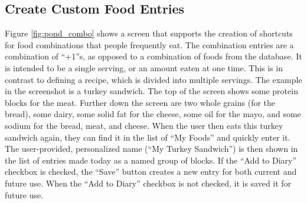 \subsection{Create Custom Food Entries}
Figure \ref{fig:pond_combo} shows a screen that supports the creation of shortcuts for food combinations that people frequently eat. The combination entries are a combination of ``+1''s, as opposed to a combination of foods from the database. It is intended to be a single serving, or an amount eaten at one time. This is in contrast to defining a recipe, which is divided into multiple servings. The example in the screenshot is a turkey sandwich. The top of the screen shows some protein blocks for the meat. Further down the screen are two whole grains (for the bread), some dairy, some solid fat for the cheese, some oil for the mayo, and some sodium for the bread, meat, and cheese. When the user then eats this turkey sandwich again, they can find it in the list of ``My Foods'' and quickly enter it. The user-provided, personalized name (``My Turkey Sandwich'') is then shown in the list of entries made today as a named group of blocks. If the ``Add to Diary'' checkbox is checked, the ``Save'' button creates a new entry for both current and future use. When the ``Add to Diary'' checkbox is not checked, it is saved it for future use. 

